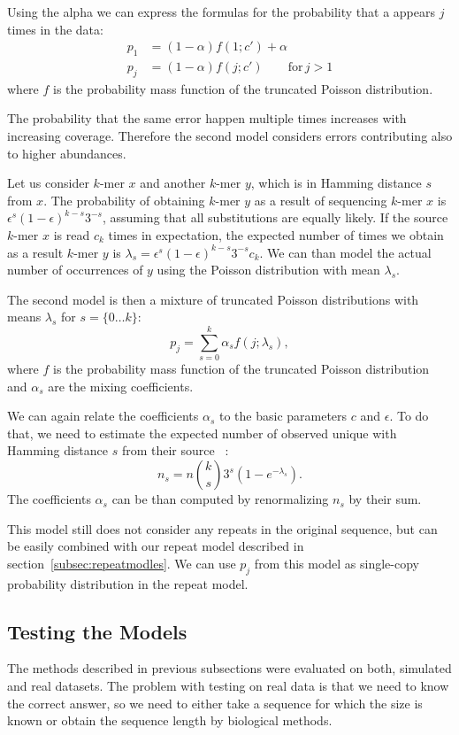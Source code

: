 Using the alpha we can express the formulas for the probability that a \kmer appears $j$ times in the data:
\begin{align*}
p_1 &= (1-\alpha) f(1; c') + \alpha \\
p_j &= (1-\alpha) f(j; c') \qquad\text{for}\, j>1
\end{align*}
where $f$ is the probability mass function of the truncated Poisson
distribution.

The probability that the same error happen multiple times increases with increasing coverage. Therefore the second model considers errors contributing also to higher abundances.

Let us consider $k$-mer $x$ and another $k$-mer $y$,
which is in Hamming distance $s$ from $x$. The probability of
obtaining $k$-mer $y$ as a result of sequencing $k$-mer $x$ is
$\epsilon^s {(1-\epsilon)}^{k-s} 3^{-s}$, assuming that all
substitutions are equally likely. If the source $k$-mer $x$ is read
$c_k$ times in expectation, the expected number of times we obtain as
a result $k$-mer $y$ is $\lambda_s = \epsilon^s {(1-\epsilon)}^{k-s}
3^{-s} c_k$. We can than model the actual number of occurrences of $y$ using the Poisson distribution with mean $\lambda_s$.

The second model is then a mixture of truncated Poisson distributions with means $\lambda_s$ for $s = \{0\dots k\}$:
$$p_j = \sum_{s=0}^k \alpha_s f(j; \lambda_s),$$
where $f$ is the probability mass function of the truncated Poisson
distribution and $\alpha_s$ are the mixing coefficients.

We can again relate the coefficients $\alpha_s$ to the basic parameters $c$ and $\epsilon$. To do that, we need to estimate the expected number of observed unique \kmers with Hamming distance $s$ from their source \kmers~\cite{covest}:
$$n_s = n {k \choose s} 3^s (1- e^{-\lambda_s}).$$
The coefficients $\alpha_s$ can be than computed by renormalizing $n_s$ by their sum.

This model still does not consider any repeats in the original sequence, but can be easily combined with our repeat model described in section~\ref{subsec:repeatmodles}. We can use $p_j$ from this model as single-copy probability distribution in the repeat model.

\subsection{Testing the Models}
The methods described in previous subsections were evaluated on both, simulated and real datasets. The problem with testing on real data is that we need to know the correct answer, so we need to either take a sequence for which the size is known or obtain the sequence length by biological methods.


